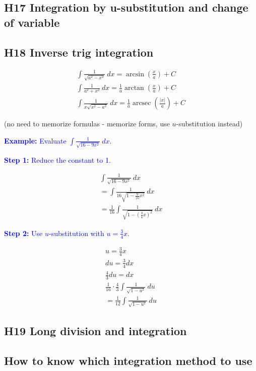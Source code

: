 \documentclass[letterpaper, 12pt]{article}
\DeclareMathOperator{\arcsec}{arcsec}
\newcommand{\example}[1]{\textcolor{blue}{\textbf{Example:} #1}}
\newcommand{\step}[2]{\textcolor{blue}{\textbf{Step #1:} #2}}
\begin{document}
\subsection*{H17 Integration by u-substitution and change of variable}

\subsection*{H18 Inverse trig integration}

\begin{gather*}
\int \frac{1}{\sqrt{a^2 - x^2}} \: dx = \arcsin \left( \frac{x}{a} \right) + C \\
\int \frac{1}{a^2 + x^2} \: dx = \frac{1}{a} \arctan \left( \frac{x}{a} \right) + C \\
\int \frac{1}{x \sqrt{x^2 - a^2}} \: dx = \frac{1}{a} \arcsec \left( \frac{|x|}{a} \right) + C
\end{gather*}

(no need to memorize formulas - memorize forms, use $u$-substitution instead)

\example{Evaluate $\displaystyle \int \frac{1}{\sqrt{16 - 9x^2}} \: dx$.}

\step{1}{Reduce the constant to 1.}

\begin{gather*}
\int \frac{1}{\sqrt{16 - 9x^2}} \: dx \\
= \int \frac{1}{16\sqrt{1 - \frac{9}{16}x^2}} \: dx \\
= \frac{1}{16} \int \frac{1}{\sqrt{1 - \left(\frac{3}{4}x\right)^2}} \: dx
\end{gather*}

\step{2}{Use $u$-substitution with $u = \frac{3}{4}x$.}

\begin{gather*}
u = \frac{3}{4}x \\
du = \frac{3}{4} dx \\
\frac{4}{3} du = dx \\
\frac{1}{16} \cdot \frac{4}{3} \int \frac{1}{\sqrt{1 - u^2}} \: du \\
= \frac{1}{12} \int \frac{1}{\sqrt{1 - u^2}} \: du
\end{gather*}

\subsection*{H19 Long division and integration}

\subsection*{How to know which integration method to use}
\end{document}

